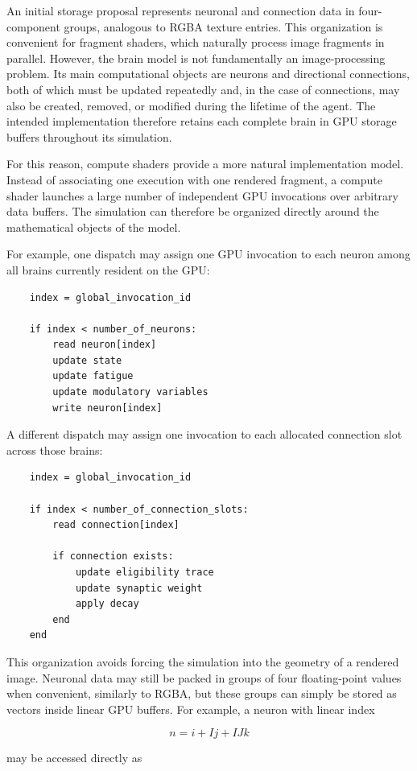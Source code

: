 \documentclass[12pt,a4paper]{article}
\begin{document}
	An initial storage proposal represents neuronal and connection data in four-component groups, analogous to RGBA texture entries. This organization is convenient for fragment shaders, which naturally process image fragments in parallel. However, the brain model is not fundamentally an image-processing problem. Its main computational objects are neurons and directional connections, both of which must be updated repeatedly and, in the case of connections, may also be created, removed, or modified during the lifetime of the agent. The intended implementation therefore retains each complete brain in GPU storage buffers throughout its simulation.

	For this reason, compute shaders provide a more natural implementation model. Instead of associating one execution with one rendered fragment, a compute shader launches a large number of independent GPU invocations over arbitrary data buffers. The simulation can therefore be organized directly around the mathematical objects of the model.

	For example, one dispatch may assign one GPU invocation to each neuron among all brains currently resident on the GPU:

	\begin{verbatim}
	index = global_invocation_id

	if index < number_of_neurons:
		read neuron[index]
		update state
		update fatigue
		update modulatory variables
		write neuron[index]
	\end{verbatim}

	A different dispatch may assign one invocation to each allocated connection slot across those brains:

	\begin{verbatim}
	index = global_invocation_id

	if index < number_of_connection_slots:
		read connection[index]

		if connection exists:
			update eligibility trace
			update synaptic weight
			apply decay
		end
	end
	\end{verbatim}

	This organization avoids forcing the simulation into the geometry of a rendered image. Neuronal data may still be packed in groups of four floating-point values when convenient, similarly to RGBA, but these groups can simply be stored as vectors inside linear GPU buffers. For example, a neuron with linear index

	$$n = i + Ij + IJk$$

	may be accessed directly as
\end{document}
